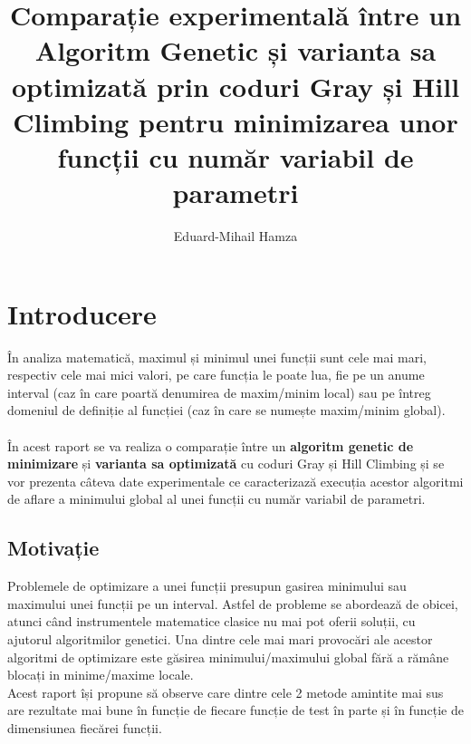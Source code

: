 \documentclass{article}
\author{Eduard-Mihail Hamza}
\title{Comparație experimentală între un Algoritm Genetic și varianta sa optimizată prin coduri Gray și Hill Climbing pentru minimizarea unor funcții cu număr variabil de parametri}
\begin{document}
\maketitle

\section{Introducere}

În analiza matematică, maximul și minimul unei funcții sunt cele mai mari, respectiv cele mai mici valori, pe care funcția le poate lua, fie pe un anume interval (caz în care poartă denumirea de maxim/minim local) sau pe întreg domeniul de definiție al funcției (caz în care se numește maxim/minim global).\\ \\
În acest raport se va realiza o comparație între un \textbf{algoritm genetic de minimizare} și \textbf{varianta sa optimizată} cu coduri Gray și Hill Climbing și se vor prezenta câteva date experimentale ce caracterizază execuția acestor algoritmi de aflare a minimului global al unei funcții cu număr variabil de parametri.

 
\subsection{Motivație}
Problemele de optimizare a unei funcții presupun gasirea minimului sau maximului unei funcții pe un interval. Astfel de probleme se abordează de obicei, atunci când instrumentele matematice clasice nu mai pot oferii soluții, cu ajutorul algoritmilor genetici. Una dintre cele mai mari provocări ale acestor algoritmi de optimizare este găsirea minimului/maximului global fără a rămâne blocați in minime/maxime locale.\\
Acest raport își propune să observe care dintre cele 2 metode amintite mai sus are rezultate mai bune în funcție de fiecare funcție de test în parte și în funcție de dimensiunea fiecărei funcții.
\end{document}
